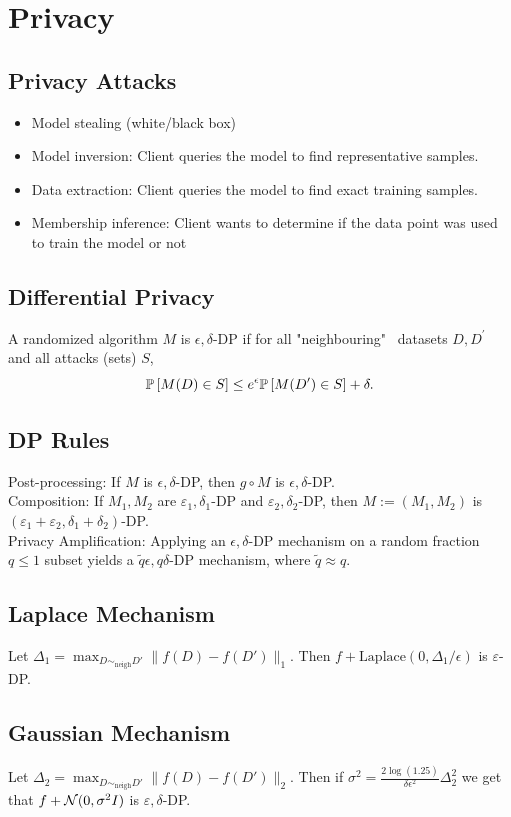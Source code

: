 \section{Privacy}
\subsection*{Privacy Attacks}
\begin{itemize}
    \item Model stealing (white/black box)
    \item Model inversion: Client queries the model to find representative samples.
    \item Data extraction: Client queries the model to find exact training samples.
    \item Membership inference: Client wants to determine if the data
          point was used to train the model or not
\end{itemize}

\subsection*{Differential Privacy}
A randomized algorithm $M$ is $\epsilon, \delta$-DP if for all "neighbouring" \ datasets $D, D^\prime$ and all attacks (sets) $S$,
$$\P\left[M(D)\in S\right] \le e^\epsilon \P\left[M(D^\prime)\in S\right]+\delta.$$
\vspace*{-6mm}
\subsection*{DP Rules}
Post-processing: If $M$ is $\epsilon,\delta$-DP, then $g\circ M$ is $\epsilon,\delta$-DP.\\
Composition: If $M_1,M_2$ are $\varepsilon_1,\delta_1$-DP and $\varepsilon_2,\delta_2$-DP, then $M:=(M_1,M_2)$ is $(\varepsilon_1+\varepsilon_2,\delta_1+\delta_2)$-DP.\\
Privacy Amplification: Applying an $\epsilon,\delta$-DP mechanism on a random fraction $q\leq1$ subset yields a $\tilde{q}\epsilon,q\delta$-DP mechanism, where $\tilde{q}\approx q$.

\subsection*{Laplace Mechanism}
Let $\Delta_1=\max_{D\sim_{\text{neigh}}D'}\|f(D)-f(D')\|_{1}$. Then $f+\text{Laplace}(0,\Delta_1/\epsilon)$ is $\varepsilon$-DP.

\subsection*{Gaussian Mechanism}
Let $\Delta_2=\max_{D\sim_{\text{neigh}}D'}\|f(D)-f(D')\|_{{2}}$. Then if $\sigma^2=\frac{2\log(1.25)}{\delta\epsilon^2}\Delta_2^2$ we get that $f+\No(0,\sigma^2I)$ is $\varepsilon,\delta$-DP.
